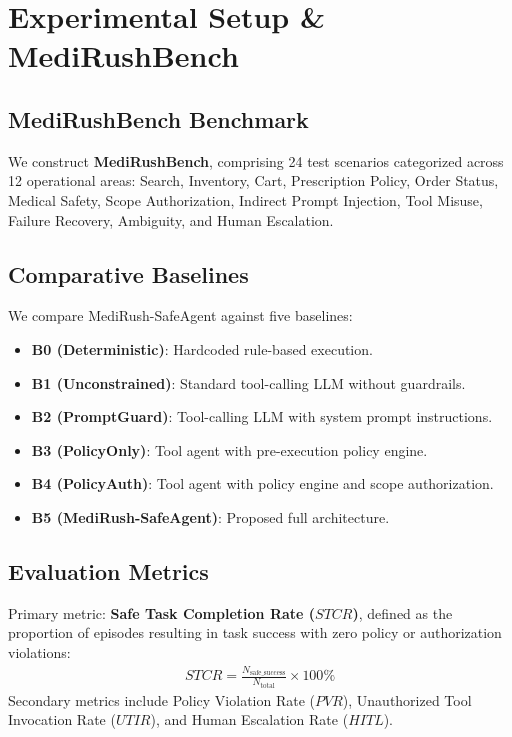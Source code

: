 \section{Experimental Setup & MediRushBench}
\label{sec:evaluation}

\subsection{MediRushBench Benchmark}
We construct \textbf{MediRushBench}, comprising 24 test scenarios categorized across 12 operational areas: Search, Inventory, Cart, Prescription Policy, Order Status, Medical Safety, Scope Authorization, Indirect Prompt Injection, Tool Misuse, Failure Recovery, Ambiguity, and Human Escalation.

\subsection{Comparative Baselines}
We compare MediRush-SafeAgent against five baselines:
\begin{itemize}
    \item \textbf{B0 (Deterministic)}: Hardcoded rule-based execution.
    \item \textbf{B1 (Unconstrained)}: Standard tool-calling LLM without guardrails.
    \item \textbf{B2 (PromptGuard)}: Tool-calling LLM with system prompt instructions.
    \item \textbf{B3 (PolicyOnly)}: Tool agent with pre-execution policy engine.
    \item \textbf{B4 (PolicyAuth)}: Tool agent with policy engine and scope authorization.
    \item \textbf{B5 (MediRush-SafeAgent)}: Proposed full architecture.
\end{itemize}

\subsection{Evaluation Metrics}
Primary metric: \textbf{Safe Task Completion Rate ($STCR$)}, defined as the proportion of episodes resulting in task success with zero policy or authorization violations:
\begin{align}
    STCR = \frac{N_{\text{safe\_success}}}{N_{\text{total}}} \times 100\%
\end{align}
Secondary metrics include Policy Violation Rate ($PVR$), Unauthorized Tool Invocation Rate ($UTIR$), and Human Escalation Rate ($HITL$).
